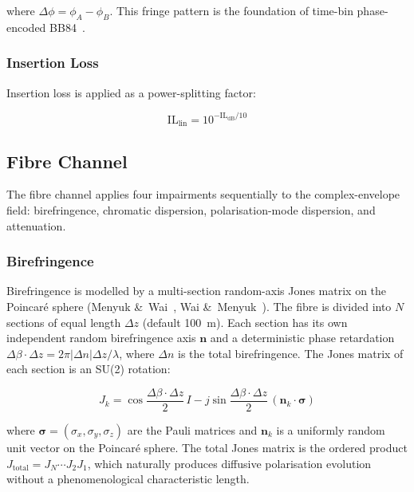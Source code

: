 \documentclass[3p,times,preprint]{elsarticle}
\begin{document}
where $\Delta\phi = \phi_A - \phi_B$.  This fringe pattern is the
foundation of time-bin phase-encoded BB84~\cite{bennett84}.

\subsubsection{Insertion Loss}

Insertion loss is applied as a power-splitting factor:

\begin{equation}
  \text{IL}_{\text{lin}} = 10^{-\text{IL}_{\text{dB}}/10}
\end{equation}

\subsection{Fibre Channel}

The fibre channel applies four impairments sequentially to the
complex-envelope field: birefringence, chromatic dispersion,
polarisation-mode dispersion, and attenuation.

\subsubsection{Birefringence}

Birefringence is modelled by a multi-section random-axis Jones matrix
on the Poincar\'e sphere (Menyuk \&~Wai~\cite{menyuk},
Wai \&~Menyuk~\cite{wai}).  The fibre is divided into $N$ sections of
equal length $\Delta z$ (default 100~m).  Each section has its own
independent random birefringence axis $\mathbf{n}$ and a deterministic
phase retardation $\Delta\beta\cdot\Delta z = 2\pi|\Delta n|\Delta z/\lambda$,
where $\Delta n$ is the total birefringence.  The Jones matrix of each
section is an SU(2) rotation:

\begin{equation}
  J_k = \cos\frac{\Delta\beta\cdot\Delta z}{2}\,I
    - j\sin\frac{\Delta\beta\cdot\Delta z}{2}\,(\mathbf{n}_k\cdot\boldsymbol{\sigma})
  \label{eq:biref}
\end{equation}

where $\boldsymbol{\sigma}=(\sigma_x,\sigma_y,\sigma_z)$ are the Pauli
matrices and $\mathbf{n}_k$ is a uniformly random unit vector on the
Poincar\'e sphere.  The total Jones matrix is the ordered product
$J_{\text{total}} = J_N \cdots J_2 J_1$, which naturally produces
diffusive polarisation evolution without a phenomenological
characteristic length.
\end{document}
